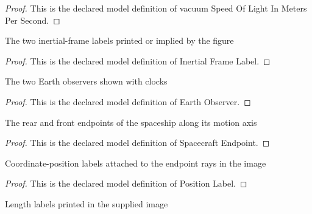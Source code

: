\begin{proof}
  This is the declared model definition of vacuum Speed Of Light In Meters Per Second.
\end{proof}
\begin{definition}
  \label{def:physics:phyx-mini-0509:phyxminiproblems-problemphyxmini0509-inertialframelabel}
  The two inertial-frame labels printed or implied by the figure
\end{definition}
\begin{proof}
  This is the declared model definition of Inertial Frame Label.
\end{proof}
\begin{definition}
  \label{def:physics:phyx-mini-0509:phyxminiproblems-problemphyxmini0509-earthobserver}
  The two Earth observers shown with clocks
\end{definition}
\begin{proof}
  This is the declared model definition of Earth Observer.
\end{proof}
\begin{definition}
  \label{def:physics:phyx-mini-0509:phyxminiproblems-problemphyxmini0509-spacecraftendpoint}
  The rear and front endpoints of the spaceship along its motion axis
\end{definition}
\begin{proof}
  This is the declared model definition of Spacecraft Endpoint.
\end{proof}
\begin{definition}
  \label{def:physics:phyx-mini-0509:phyxminiproblems-problemphyxmini0509-positionlabel}
  Coordinate-position labels attached to the endpoint rays in the image
\end{definition}
\begin{proof}
  This is the declared model definition of Position Label.
\end{proof}
\begin{definition}
  \label{def:physics:phyx-mini-0509:phyxminiproblems-problemphyxmini0509-figurelengthlabel}
  Length labels printed in the supplied image
\end{definition}
